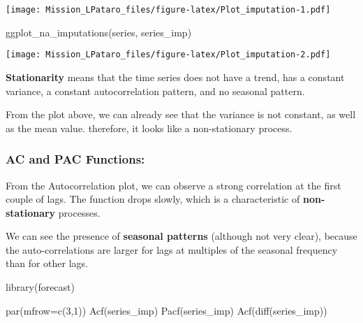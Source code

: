 \documentclass[
]{article}
\newenvironment{Shaded}{\begin{snugshade}}{\end{snugshade}}
\newcommand{\AttributeTok}[1]{\textcolor[rgb]{0.77,0.63,0.00}{#1}}
\newcommand{\DecValTok}[1]{\textcolor[rgb]{0.00,0.00,0.81}{#1}}
\newcommand{\FunctionTok}[1]{\textcolor[rgb]{0.00,0.00,0.00}{#1}}
\newcommand{\NormalTok}[1]{#1}
\begin{document}
\texttt{[image: Mission\_LPataro\_files/figure-latex/Plot\_imputation-1.pdf]}

\begin{Shaded}
\begin{Highlighting}[]
\FunctionTok{ggplot\_na\_imputations}\NormalTok{(series, series\_imp)}
\end{Highlighting}
\end{Shaded}

\texttt{[image: Mission\_LPataro\_files/figure-latex/Plot\_imputation-2.pdf]}

\textbf{Stationarity} means that the time series does not have a trend,
has a constant variance, a constant autocorrelation pattern, and no
seasonal pattern.

From the plot above, we can already see that the variance is not
constant, as well as the mean value. therefore, it looks like a
non-stationary process.

\hypertarget{ac-and-pac-functions}{%
\subsubsection{AC and PAC Functions:}\label{ac-and-pac-functions}}

From the Autocorrelation plot, we can observe a strong correlation at
the first couple of lags. The function drops slowly, which is a
characteristic of \textbf{non-stationary} processes.

We can see the presence of \textbf{seasonal patterns} (although not very
clear), because the auto-correlations are larger for lags at multiples
of the seasonal frequency than for other lags.

\begin{Shaded}
\begin{Highlighting}[]
\FunctionTok{library}\NormalTok{(forecast)}
\end{Highlighting}
\end{Shaded}

\begin{Shaded}
\begin{Highlighting}[]
\FunctionTok{par}\NormalTok{(}\AttributeTok{mfrow=}\FunctionTok{c}\NormalTok{(}\DecValTok{3}\NormalTok{,}\DecValTok{1}\NormalTok{))}
\FunctionTok{Acf}\NormalTok{(series\_imp)}
\FunctionTok{Pacf}\NormalTok{(series\_imp)}
\FunctionTok{Acf}\NormalTok{(}\FunctionTok{diff}\NormalTok{(series\_imp))}
\end{Highlighting}
\end{Shaded}
\end{document}
